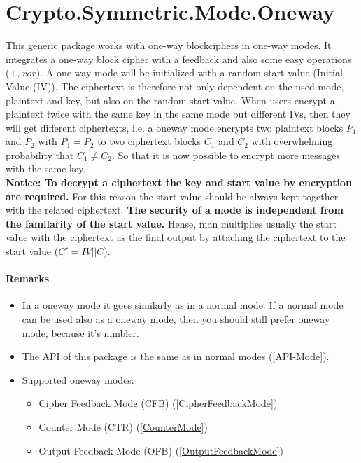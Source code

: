 \chapter{Crypto.Symmetric.Mode.Oneway}
This generic package works with one-way blockciphers in one-way modes. It integrates a one-way block cipher with a feedback and also some easy operations ($+,xor$). A one-way mode will be initialized with a random start value (Initial Value (IV)). The ciphertext is therefore not only dependent on the used mode, plaintext and key, but also on the random start value. When users encrypt a plaintext twice with the same key in the same mode but different IVs, then they will get different ciphertexts, i.e. a oneway mode encrypts two plaintext blocks $P_1$ and $P_2$ with $P_1=P_2$ to two ciphertext blocks $C_1$ and $C_2$ with overwhelming probability that $C_1\neq C_2$. So that it is now possible to encrypt more messages with the same key.\\
\textbf{Notice: To decrypt a ciphertext the key and start value by encryption are required.} For this reason the start value should be always kept together with the related ciphertext. \textbf{The security of a mode is independent from the familarity of the start value.} Hense, man multiplies usually the start value with the ciphertext as the final output by attaching the ciphertext to the start value ($C'=IV||C$).
\subsubsection*{Remarks}
\begin{itemize}
\item In a oneway mode it goes similarly as in a normal mode. If a normal mode can be used also as a oneway mode, then you should still prefer oneway mode, because it's nimbler.  
\item The API of this package is the same as in normal modes (\ref{API-Mode}).
\item Supported oneway modes:
\begin{itemize}
\item Cipher Feedback Mode (CFB) (\ref{CipherFeedbackMode})
\item Counter Mode (CTR) (\ref{CounterMode})
\item Output Feedback Mode (OFB) (\ref{OutputFeedbackMode})
\end{itemize}
\end{itemize}
